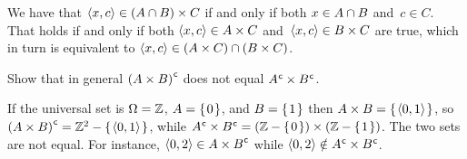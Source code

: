 \documentclass{ibl}  %
\begin{document}
\begin{problem}[\maxlength]
\begin{exes}
\begin{answer}
  We have that $\langle x,c\rangle\in (A\cap B)\times C$
  if and only if both
  $x\in A\cap B$ and~$c\in C$.
  That holds if and only if both
  $\langle x,c\rangle\in A\times C$ and~$\langle x,c\rangle\in B\times C$ are true,
  which in turn is equivalent to
  $\langle x,c\rangle\in (A\times C)\cap (B\times C)$.  
\end{answer}
\begin{exercise} 
  Show that in general ${(A\times B)}^{\mspace{1mu}\mathsf{c}}$ does not equal 
  ${A}^{\mspace{1mu}\mathsf{c}}\times{B}^{\mspace{1mu}\mathsf{c}}$.
\end{exercise}
\begin{answer}
  If the universal set is $\Omega=\mathbb{Z}$,
  $A=\mbox{$\{\hspace{0.1em}0\hspace{0.1em}\}$}$, and $B=\mbox{$\{\hspace{0.1em}1\hspace{0.1em}\}$}$ then $A\times B=\mbox{$\{\hspace{0.1em}\langle0,1\rangle\hspace{0.1em}\}$}$,
  so ${(A\times B)}^{\mspace{1mu}\mathsf{c}}=\mathbb{Z}^2-\mbox{$\{\hspace{0.1em}\langle0,1\rangle\hspace{0.1em}\}$}$,
  while ${A}^{\mspace{1mu}\mathsf{c}}\times{B}^{\mspace{1mu}\mathsf{c}}=(\mathbb{Z}-\mbox{$\{\hspace{0.1em}0\hspace{0.1em}\}$})\times(\mathbb{Z}-\mbox{$\{\hspace{0.1em}1\hspace{0.1em}\}$})$.
  The two sets are not equal. 
  For instance, $\langle0,2\rangle\in {A\times B}^{\mspace{1mu}\mathsf{c}}$
  while $\langle0,2\rangle\notin{A}^{\mspace{1mu}\mathsf{c}}\times{B}^{\mspace{1mu}\mathsf{c}}$.  
\end{answer}
\end{exes}
  


\end{problem}
\end{document}
